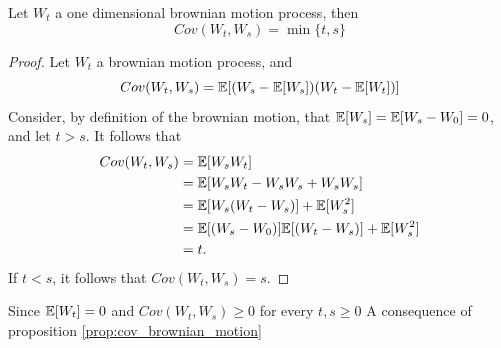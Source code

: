 \documentclass[../TGMAFFIRO]{subfiles}
\begin{document}
\begin{proposition}\label{prop:cov_brownian_motion}
Let $W_t$ a one dimensional brownian motion process, then
\[
	Cov(W_t, W_s) = \min\{t, s\}
\]
\end{proposition}

\begin{proof}
Let $W_t$ a brownian motion process, and
\begin{equation}
	Cov(W_t, W_s) = \mathbb{E}[(W_s - \mathbb{E}[W_s])(W_t - \mathbb{E}[W_t])]
\end{equation}
Consider, by definition of the brownian motion, that $\mathbb{E}[W_s] = \mathbb{E}[W_s - W_0] = 0$, and let $ t > s$. It follows that
\begin{align*}
	Cov(W_t, W_s) &= \mathbb{E}[W_sW_t] \\
				  &= \mathbb{E}[W_sW_t - W_sW_s + W_sW_s]\\
				  &= \mathbb{E}[W_s(W_t - W_s)] + \mathbb{E}[W_s^2]\\
				  &= \mathbb{E}[(W_s - W_0)]\mathbb{E}[(W_t - W_s)] + \mathbb{E}[W_s^2]\\
				  &= t.
\end{align*}
If $t < s$, it follows that $Cov(W_t, W_s) = s$.
\end{proof}

\begin{remark}
	Since $\mathbb{E}[W_t] = 0$ and $Cov(W_t, W_s) \geq 0$ for every $t, s \geq 0$
	A consequence of proposition \ref{prop:cov_brownian_motion}
\end{remark}
\end{document}
